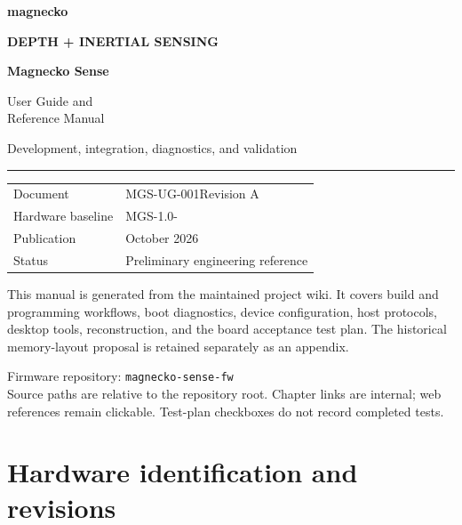 \documentclass[10pt,a4paper,oneside]{report}
\newcommand{\ProductName}{Magnecko Sense}
\newcommand{\BoardVersion}{MGS-1.0-}
\newcommand{\DocumentID}{MGS-UG-001}
\newcommand{\DocumentRevision}{A}
\newcommand{\DocumentDate}{October 2026}
\begin{document}
\raggedright
\hypersetup{pageanchor=false}
\begin{titlepage}
\thispagestyle{empty}
{\color{MGSRed}\Large\bfseries magnecko}\par
\vspace{22mm}
{\color{MGSRed}\small\bfseries DEPTH + INERTIAL SENSING}\par
\vspace{4mm}
{\fontsize{32}{38}\selectfont\bfseries\ProductName}\par
\vspace{6mm}
{\fontsize{22}{29}\selectfont User Guide and\\Reference Manual\par}
\vspace{10mm}
{\large Development, integration, diagnostics, and validation}\par
\vspace{9mm}
\textcolor{MGSRed}{\rule{\linewidth}{1.2pt}}\par
\vspace{8mm}
\begin{tabular}{@{}ll}
Document & \DocumentID\quad Revision \DocumentRevision \\
Hardware baseline & \BoardVersion \\
Publication & \DocumentDate \\
Status & Preliminary engineering reference
\end{tabular}
\vfill
{\small This manual is generated from the maintained project wiki. It covers
build and programming workflows, boot diagnostics, device configuration, host
protocols, desktop tools, reconstruction, and the board acceptance test plan.
The historical memory-layout proposal is retained separately as an appendix.\par}
\vspace{6mm}
{\small\color{MGSMuted}Firmware repository: \texttt{magnecko-sense-fw}\\
Source paths are relative to the repository root. Chapter links are internal;
web references remain clickable. Test-plan checkboxes do not record completed tests.\par}
\end{titlepage}
\hypersetup{pageanchor=true}
\tableofcontents
\clearpage
{}
\chapter{Hardware identification and revisions}\label{readme--hardware-revision-standard}
\end{document}

